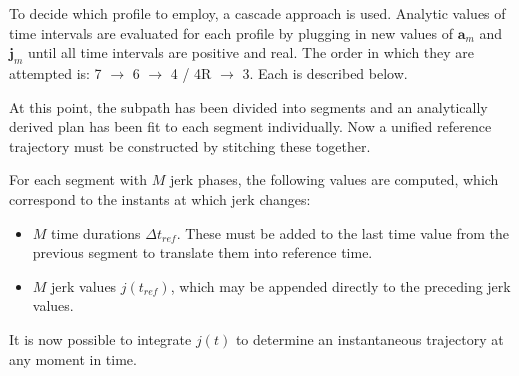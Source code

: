 \documentclass[letterpaper, 10 pt, conference]{ieeeconf}  %
\begin{document}
To decide which profile to employ, a cascade approach is used.
Analytic values of time intervals are evaluated for each profile by plugging in new values of $\mathbf{a}_m$ and $\mathbf{j}_m$ until all time intervals are positive and real.
The order in which they are attempted is: 7 $\rightarrow$ 6 $\rightarrow$ 4 / 4R $\rightarrow$ 3.
Each is described below.


At this point, the subpath has been divided into segments and an analytically derived plan has been fit to each segment individually.
Now a unified reference trajectory must be constructed by stitching these together.

For each segment with $M$ jerk phases, the following values are computed, which correspond to the instants at which jerk changes:
\begin{itemize}
  \item $M$ time durations $\Delta t_{ref}$. These must be added to the last time value from the previous segment to translate them into reference time.
  \item $M$ jerk values $j(t_{ref})$, which may be appended directly to the preceding jerk values.
\end{itemize}
It is now possible to integrate $j(t)$ to determine an instantaneous trajectory at any moment in time.



\end{document}
